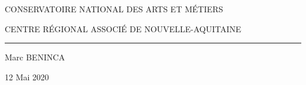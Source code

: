 \newcommand{\hrq}[0]{\rule{\textwidth/4}{1pt}}
\begin{titlepage}
\cnam
\begin{center}
{\bfseries
\begin{large}

{\LARGE C}ONSERVATOIRE {\LARGE N}ATIONAL DES {\LARGE A}RTS ET {\LARGE M}ÉTIERS

{\normalsize CENTRE RÉGIONAL ASSOCIÉ DE NOUVELLE-AQUITAINE}

\vfill
\hrq
\vfill

{\Large \fulltitle}

Marc BENINCA

12 Mai 2020

\end{large}
}
\end{center}
\end{titlepage}
